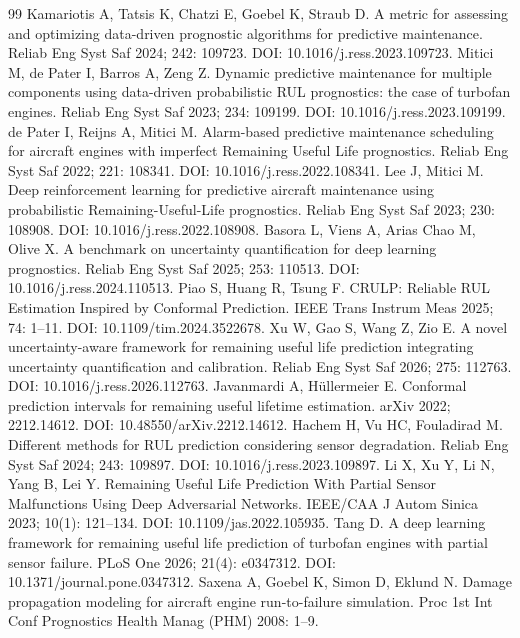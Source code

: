 \documentclass[11pt,a4paper]{article}
\begin{document}
\begin{thebibliography}{99}
\small
\setlength{\itemsep}{0pt}
 Kamariotis A, Tatsis K, Chatzi E, Goebel K, Straub D. A metric for assessing and optimizing data-driven prognostic algorithms for predictive maintenance. Reliab Eng Syst Saf 2024; 242: 109723. DOI: 10.1016/j.ress.2023.109723.
 Mitici M, de Pater I, Barros A, Zeng Z. Dynamic predictive maintenance for multiple components using data-driven probabilistic RUL prognostics: the case of turbofan engines. Reliab Eng Syst Saf 2023; 234: 109199. DOI: 10.1016/j.ress.2023.109199.
 de Pater I, Reijns A, Mitici M. Alarm-based predictive maintenance scheduling for aircraft engines with imperfect Remaining Useful Life prognostics. Reliab Eng Syst Saf 2022; 221: 108341. DOI: 10.1016/j.ress.2022.108341.
 Lee J, Mitici M. Deep reinforcement learning for predictive aircraft maintenance using probabilistic Remaining-Useful-Life prognostics. Reliab Eng Syst Saf 2023; 230: 108908. DOI: 10.1016/j.ress.2022.108908.
 Basora L, Viens A, Arias Chao M, Olive X. A benchmark on uncertainty quantification for deep learning prognostics. Reliab Eng Syst Saf 2025; 253: 110513. DOI: 10.1016/j.ress.2024.110513.
 Piao S, Huang R, Tsung F. CRULP: Reliable RUL Estimation Inspired by Conformal Prediction. IEEE Trans Instrum Meas 2025; 74: 1--11. DOI: 10.1109/tim.2024.3522678.
 Xu W, Gao S, Wang Z, Zio E. A novel uncertainty-aware framework for remaining useful life prediction integrating uncertainty quantification and calibration. Reliab Eng Syst Saf 2026; 275: 112763. DOI: 10.1016/j.ress.2026.112763.
 Javanmardi A, H\"ullermeier E. Conformal prediction intervals for remaining useful lifetime estimation. arXiv 2022; 2212.14612. DOI: 10.48550/arXiv.2212.14612.
 Hachem H, Vu HC, Fouladirad M. Different methods for RUL prediction considering sensor degradation. Reliab Eng Syst Saf 2024; 243: 109897. DOI: 10.1016/j.ress.2023.109897.
 Li X, Xu Y, Li N, Yang B, Lei Y. Remaining Useful Life Prediction With Partial Sensor Malfunctions Using Deep Adversarial Networks. IEEE/CAA J Autom Sinica 2023; 10(1): 121--134. DOI: 10.1109/jas.2022.105935.
 Tang D. A deep learning framework for remaining useful life prediction of turbofan engines with partial sensor failure. PLoS One 2026; 21(4): e0347312. DOI: 10.1371/journal.pone.0347312.
 Saxena A, Goebel K, Simon D, Eklund N. Damage propagation modeling for aircraft engine run-to-failure simulation. Proc 1st Int Conf Prognostics Health Manag (PHM) 2008: 1--9.

\end{thebibliography}
\end{document}
